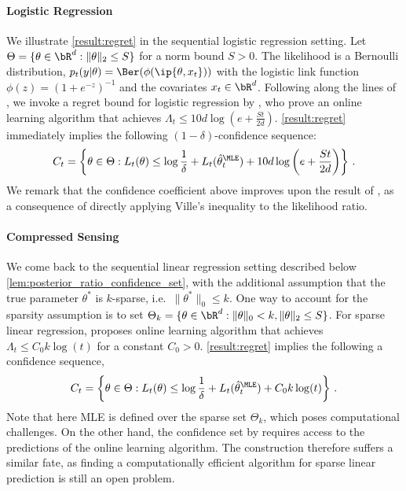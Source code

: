 \paragraph{Logistic Regression} We illustrate \cref{result:regret} in the sequential logistic regression setting. Let $\Theta = \{\theta \in \bR^d : \|\theta\|_2 \leq S\}$ for a norm bound $S > 0$. The likelihood is a Bernoulli distribution, $p_t(y|\theta) = \Ber(\phi(\ip{\theta, x_t}))$ with the logistic link function $\phi(z) = (1 + e^{-z})^{-1}$  and the covariates $x_t \in \bR^d$. Following along the lines of \citet{lee2024improved}, we invoke a regret bound for logistic regression by \cite{foster2018logistic}, who prove an online learning algorithm that achieves $\Lambda_t \leq 10d \log \left( e + \frac{St}{2d} \right)$. \cref{result:regret} immediately implies the following $(1-\delta)$-confidence sequence:
\begin{align*}
    C_t = \left\{ \theta \in \Theta: L_t(\theta) \leq  \log \frac{1}{\delta} + L_t(\hat \theta_t^\MLE) + 10d \log \left( e + \frac{St}{2d}  \right)\right\} \,.
\end{align*}
We remark that the confidence coefficient above improves upon the result of \citet[Theorem 1]{lee2024improved}, as a consequence of directly applying Ville's inequality to the likelihood ratio.


\paragraph{Compressed Sensing} We come back to the sequential linear regression setting described below \cref{lem:posterior_ratio_confidence_set}, with the additional assumption that the true parameter $\theta^*$ is $k$-sparse, i.e.~$\|\theta^*\|_0 \leq k$. One way to account for the sparsity assumption is to set $\Theta_k = \{\theta \in \bR^d : \|\theta\|_0 < k, \|\theta\|_2 \leq S\}$. For sparse linear regression, \citep{gerchinovitz2011sparsity} proposes online learning algorithm  that achieves $\Lambda_t \leq C_0 k \log(t)$ for a constant $C_0 > 0$. \cref{result:regret} implies the following a confidence sequence,
\begin{align*}
    C_t = \left\{ \theta \in \Theta: L_t(\theta) \leq  \log \frac{1}{\delta} + L_t(\hat \theta_t^\MLE) + C_0 k \log(t)\right\} \,.
\end{align*}
Note that here MLE is defined over the sparse set $\Theta_k$, which poses computational challenges. On the other hand, the confidence set by \citet{abbasi2012online} requires access to the predictions of the online learning algorithm. The construction therefore suffers a similar fate, as finding a computationally efficient algorithm for sparse linear prediction is still an open problem.

